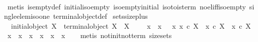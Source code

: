 \begin{isabellebody}
%
\isadelimproof
\ \ %
\endisadelimproof
%
\isatagproof
{}\isamarkupfalse%
\ {\isacharparenleft}{\kern0pt}metis\ is{\isacharunderscore}{\kern0pt}empty{\isacharunderscore}{\kern0pt}def\ initial{\isacharunderscore}{\kern0pt}iso{\isacharunderscore}{\kern0pt}empty\ iso{\isacharunderscore}{\kern0pt}empty{\isacharunderscore}{\kern0pt}initial\ iso{\isacharunderscore}{\kern0pt}to{}{\isacharunderscore}{\kern0pt}is{\isacharunderscore}{\kern0pt}term\ no{\isacharunderscore}{\kern0pt}el{\isacharunderscore}{\kern0pt}iff{\isacharunderscore}{\kern0pt}iso{\isacharunderscore}{\kern0pt}empty\ single{\isacharunderscore}{\kern0pt}elem{\isacharunderscore}{\kern0pt}iso{\isacharunderscore}{\kern0pt}one\ terminal{\isacharunderscore}{\kern0pt}object{\isacharunderscore}{\kern0pt}def{\isacharparenright}{\kern0pt}%
\endisatagproof
{\isafoldproof}%
%
\isadelimproof
\isanewline
%
\endisadelimproof
\isanewline
{}\isamarkupfalse%
\ sets{\isacharunderscore}{\kern0pt}size{\isacharunderscore}{\kern0pt}{}{\isacharunderscore}{\kern0pt}plus{\isacharcolon}{\kern0pt}\isanewline
\ \ {\isachardoublequoteopen}{\isacharparenleft}{\kern0pt}{\isasymnot}{\isacharparenleft}{\kern0pt}initial{\isacharunderscore}{\kern0pt}object\ X{\isacharparenright}{\kern0pt}\ {\isasymand}\ {\isasymnot}{\isacharparenleft}{\kern0pt}terminal{\isacharunderscore}{\kern0pt}object\ X{\isacharparenright}{\kern0pt}\ {\isasymand}\ {\isasymnot}{\isacharparenleft}{\kern0pt}X\ {\isasymcong}\ {\isasymOmega}{\isacharparenright}{\kern0pt}{\isacharparenright}{\kern0pt}\ {\isacharequal}{\kern0pt}\ {\isacharparenleft}{\kern0pt}{\isasymexists}\ x{}{\isachardot}{\kern0pt}\ {\isasymexists}\ x{}{\isachardot}{\kern0pt}\ \ {\isasymexists}\ x{}{\isachardot}{\kern0pt}\ x{}\ {\isasymin}\isactrlsub c\ X\ {\isasymand}\ x{}\ {\isasymin}\isactrlsub c\ X\ {\isasymand}\ x{}\ {\isasymin}\isactrlsub c\ X\ {\isasymand}\ x{}\ {\isasymnoteq}\ x{}\ {\isasymand}\ x{}\ {\isasymnoteq}\ x{}\ {\isasymand}\ x{}\ {\isasymnoteq}\ x{}{\isacharparenright}{\kern0pt}{\isachardoublequoteclose}\isanewline
%
\isadelimproof
\ \ %
\endisadelimproof
%
\isatagproof
{}\isamarkupfalse%
\ {\isacharparenleft}{\kern0pt}metis\ not{\isacharunderscore}{\kern0pt}init{\isacharunderscore}{\kern0pt}not{\isacharunderscore}{\kern0pt}term\ size{\isacharunderscore}{\kern0pt}{}{\isacharunderscore}{\kern0pt}sets{\isacharparenright}{\kern0pt}%
\endisatagproof
{\isafoldproof}%
%

\end{isabellebody}
